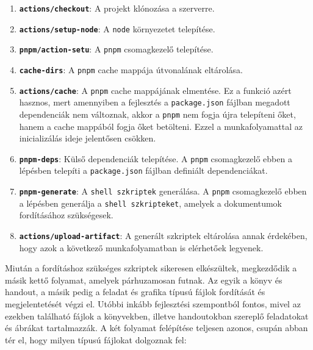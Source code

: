 \begin{enumerate}
	\item \textbf{\texttt{actions/checkout}}:
	      A projekt klónozása a szerverre.

	\item \textbf{\texttt{actions/setup-node}}:
	      A \texttt{node} környezetet telepítése.

	\item \textbf{\texttt{pnpm/action-setu}}:
	      A \texttt{pnpm} csomagkezelő telepítése.

	\item \textbf{\texttt{cache-dirs}}:
	      A \texttt{pnpm} cache mappája útvonalának eltárolása.

	\item \textbf{\texttt{actions/cache}}:
	      A \texttt{pnpm} cache mappájának elmentése. Ez a funkció azért hasznos,
	      mert amennyiben a fejlesztés a \texttt{package.json} fájlban megadott
	      dependenciák nem változnak, akkor a \texttt{pnpm} nem fogja újra
	      telepíteni őket, hanem a cache mappából fogja őket betölteni.
	      Ezzel a munkafolyamattal az inicializálás ideje jelentősen csökken.

	\item \textbf{\texttt{pnpm-deps}}:
	      Külső dependenciák telepítése. A \texttt{pnpm} csomagkezelő ebben a
	      lépésben telepíti a \texttt{package.json} fájlban definiált
	      dependenciákat.

	\item \textbf{\texttt{pnpm-generate}}:
	      A \texttt{shell szkriptek} generálása. A \texttt{pnpm} csomagkezelő
	      ebben a lépésben generálja a \texttt{shell szkripteket}, amelyek
	      a dokumentumok fordításához szükségesek.

	\item \textbf{\texttt{actions/upload-artifact}}:
	      A generált szkriptek eltárolása annak érdekében, hogy azok a következő
	      munkafolyamatban is elérhetőek legyenek.
\end{enumerate}

Miután a fordításhoz szükséges szkriptek sikeresen elkészültek, megkezdődik
a másik kettő folyamat, amelyek párhuzamosan futnak. Az egyik a könyv és
handout, a másik pedig a feladat és grafika típusú fájlok fordítását és
megjelentetését végzi el. Utóbbi inkább fejlesztési szempontból fontos, mivel
az ezekben található fájlok a könyvekben, illetve handoutokban szereplő
feladatokat és ábrákat tartalmazzák. A két folyamat felépítése teljesen azonos,
csupán abban tér el, hogy milyen típusú fájlokat dolgoznak fel:

